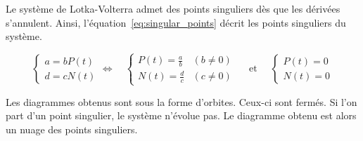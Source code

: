 Le système de Lotka-Volterra admet des points singuliers dès que les dérivées s'annulent. Ainsi, l'équation~\ref{eq:singular_points} décrit les points singuliers du système.

\begin{equation}
	\label{eq:singular_points}
	\begin{cases}
		a = bP(t)\\
		d = cN(t)
	\end{cases} \Leftrightarrow\quad
	\begin{cases}
		P(t) = \frac{a}{b} &(b \neq 0)\\
		N(t) = \frac{d}{c} &(c\neq 0)
	\end{cases}
	\quad\text{ et }\quad
	\begin{cases}
		P(t) = 0\\
		N(t) = 0
	\end{cases}
\end{equation}

Les diagrammes obtenus sont sous la forme d'orbites. Ceux-ci sont fermés. Si l'on part d'un point singulier, le système n'évolue pas. Le diagramme obtenu est alors un nuage des points singuliers.